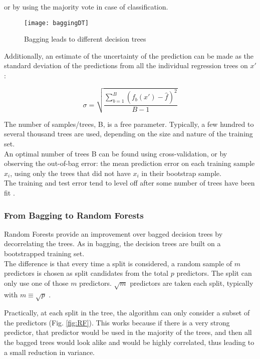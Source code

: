 or by using the majority vote in case of classification.

\begin{figure}[H]
	\centering
	\texttt{[image: baggingDT]}
	\caption{Bagging leads to different decision trees \cite{baggingDT}}
	\label{fig:baggingDT}
\end{figure}

Additionally, an estimate of the uncertainty of the prediction can be made as the standard deviation of the predictions from all the individual regression trees on $x'$:

\begin{equation}
{\sigma ={\sqrt {\frac {\sum_{b=1}^{B}(f_{b}(x')-{\hat {f}})^{2}}{B-1}}}}
\end{equation}

The number of samples/trees, B, is a free parameter. Typically, a few hundred to several thousand trees are used, depending on the size and nature of the training set. \\
An optimal number of trees B can be found using cross-validation, or by observing the out-of-bag error: the mean prediction error on each training sample $x_i$, using only the trees that did not have $x_i$ in their bootstrap sample. \\
The training and test error tend to level off after some number of trees have been fit \cite{ISLR}.

\subsubsection{From Bagging to Random Forests}
Random Forests provide an improvement over bagged decision trees by decorrelating the trees. As in bagging, the decision trees are built on a bootstrapped training set. \\
The difference is that every time a split is considered, a random sample of $m$ predictors is chosen as split candidates from the total $p$ predictors. The split can only use one of those $m$ predictors. $\sqrt{m}$ predictors are taken each split, typically with $m \equiv \sqrt{p}$ \cite{ISLR}.

Practically, at each split in the tree, the algorithm can only consider a subset of the predictors (Fig. \ref{fig:RF}). This works because if there is a very strong predictor, that predictor would be used in the majority of the trees, and then all the bagged trees would look alike and would be highly correlated, thus leading to a small reduction in variance.

